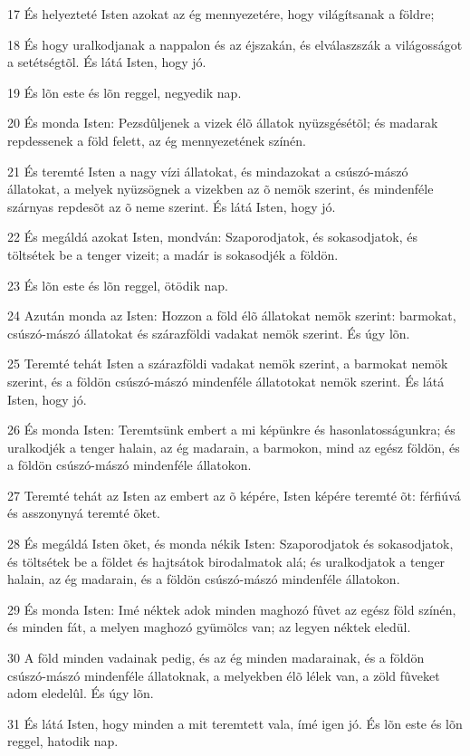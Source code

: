 \par 17 És helyezteté Isten azokat az ég mennyezetére, hogy világítsanak a földre;
\par 18 És hogy uralkodjanak a nappalon és az éjszakán, és elválaszszák a világosságot a setétségtõl. És látá Isten, hogy jó.
\par 19 És lõn este és lõn reggel, negyedik nap.
\par 20 És monda Isten: Pezsdûljenek a vizek élõ állatok nyüzsgésétõl; és madarak repdessenek a föld felett, az ég mennyezetének színén.
\par 21 És teremté Isten a nagy vízi állatokat, és mindazokat a csúszó-mászó állatokat, a melyek nyüzsögnek a vizekben az õ nemök szerint, és mindenféle szárnyas repdesõt az õ neme szerint. És látá Isten, hogy jó.
\par 22 És megáldá azokat Isten, mondván: Szaporodjatok, és sokasodjatok, és töltsétek be a tenger vizeit; a madár is sokasodjék a földön.
\par 23 És lõn este és lõn reggel, ötödik nap.
\par 24 Azután monda az Isten: Hozzon a föld élõ állatokat nemök szerint: barmokat, csúszó-mászó állatokat és szárazföldi vadakat nemök szerint. És úgy lõn.
\par 25 Teremté tehát Isten a szárazföldi vadakat nemök szerint, a barmokat nemök szerint, és a földön csúszó-mászó mindenféle állatotokat nemök szerint. És látá Isten, hogy jó.
\par 26 És monda Isten: Teremtsünk embert a mi képünkre és hasonlatosságunkra; és uralkodjék a tenger halain, az ég madarain, a barmokon, mind az egész földön, és a földön csúszó-mászó mindenféle állatokon.
\par 27 Teremté tehát az Isten az embert az õ képére, Isten képére teremté õt: férfiúvá és asszonynyá teremté õket.
\par 28 És megáldá Isten õket, és monda nékik Isten: Szaporodjatok és sokasodjatok, és töltsétek be a földet és hajtsátok birodalmatok alá; és uralkodjatok a tenger halain, az ég madarain, és a földön csúszó-mászó mindenféle állatokon.
\par 29 És monda Isten: Imé néktek adok minden maghozó fûvet az egész föld színén, és minden fát, a melyen maghozó gyümölcs van; az legyen néktek eledül.
\par 30 A föld minden vadainak pedig, és az ég minden madarainak, és a földön csúszó-mászó mindenféle állatoknak, a melyekben élõ lélek van, a zöld fûveket adom eledelûl. És úgy lõn.
\par 31 És látá Isten, hogy minden a mit teremtett vala, ímé igen jó. És lõn este és lõn reggel, hatodik nap.


